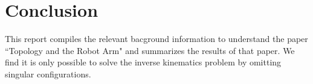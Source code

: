 \documentclass[12pt]{article}
\theoremstyle{definition}
\begin{document}
\section{Conclusion}
This report compiles the relevant bacground information to understand the paper
``Topology and the Robot Arm"
\cite{topology-robot-arm} and summarizes the results of that paper.
We find it is only possible to solve the inverse kinematics problem 
by omitting singular configurations.

\printbibliography
\end{document}

